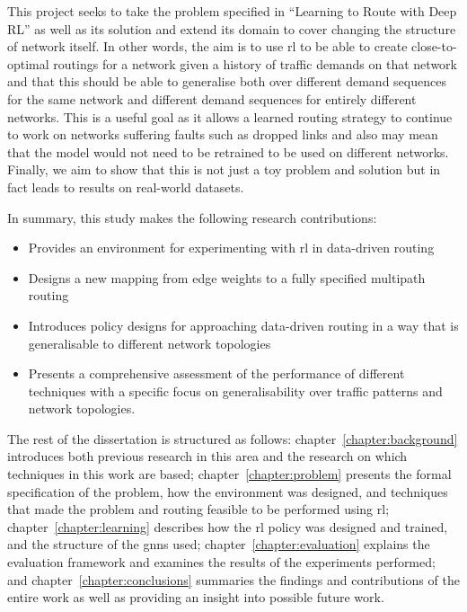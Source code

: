 This project seeks to take the problem specified in ``Learning to Route with Deep RL'' as well as its solution and extend its domain to cover changing the structure of network itself. In other words, the aim is to use \ac{rl} to be able to create close-to-optimal routings for a network given a history of traffic demands on that network and that this should be able to generalise both over different demand sequences for the same network and different demand sequences for entirely different networks. This is a useful goal as it allows a learned routing strategy to continue to work on networks suffering faults such as dropped links and also may mean that the model would not need to be retrained to be used on different networks. Finally, we aim to show that this is not just a toy problem and solution but in fact leads to results on real-world datasets.

In summary, this study makes the following research contributions:
\begin{itemize}
  \item Provides an environment for experimenting with \ac{rl} in data-driven routing
  \item Designs a new mapping from edge weights to a fully specified multipath routing
  \item Introduces policy designs for approaching data-driven routing in a way that is generalisable to different network topologies
  \item Presents a comprehensive assessment of the performance of different techniques with a specific focus on generalisability over traffic patterns and network topologies.
\end{itemize}

The rest of the dissertation is structured as follows: chapter~\ref{chapter:background} introduces both previous research in this area and the research on which techniques in this work are based; chapter~\ref{chapter:problem} presents the formal specification of the problem, how the environment was designed, and techniques that made the problem and routing feasible to be performed using \ac{rl}; chapter~\ref{chapter:learning} describes how the \ac{rl} policy was designed and trained, and the structure of the \acp{gnn} used; chapter~\ref{chapter:evaluation} explains the evaluation framework and examines the results of the experiments performed; and chapter~\ref{chapter:conclusions} summaries the findings and contributions of the entire work as well as providing an insight into possible future work.
